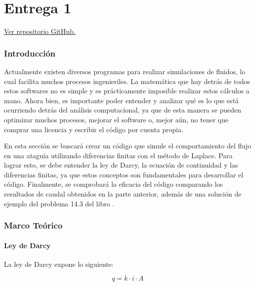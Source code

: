 \part{Entrega 1}
\sloppy

\begin{center}
    \href{https://github.com/LukasWolff2002/PROYECTO_1_MCOC_ENTREGA_1}{Ver repositorio GitHub.}
\end{center}

\setcounter{section}{0}

\section{Introducción}

Actualmente existen diversos programas para realizar simulaciones de fluidos, lo cual facilita muchos procesos ingenieriles. La matemática que hay detrás de todos estos softwares no es simple y es prácticamente imposible realizar estos cálculos a mano. Ahora bien, es importante poder entender y analizar qué es lo que está ocurriendo detrás del análisis computacional, ya que de esta manera se pueden optimizar muchos procesos, mejorar el software o, mejor aún, no tener que comprar una licencia y escribir el código por cuenta propia.

En esta sección se buscará crear un código que simule el comportamiento del flujo en una ataguía utilizando diferencias finitas con el método de Laplace. Para lograr esto, se debe entender la ley de Darcy, la ecuación de continuidad y las diferencias finitas, ya que estos conceptos son fundamentales para desarrollar el código. Finalmente, se comprobará la eficacia del código comparando los resultados de caudal obtenidos en la parte anterior, además de una solución de ejemplo del problema 14.3 del libro \textbf{\cite{budhuSoilMechanics}}.

\section{Marco Teórico}

\subsection{Ley de Darcy}

La ley de Darcy expone lo siguiente:

\begin{equation}
    q = k \cdot i \cdot A
\end{equation}

